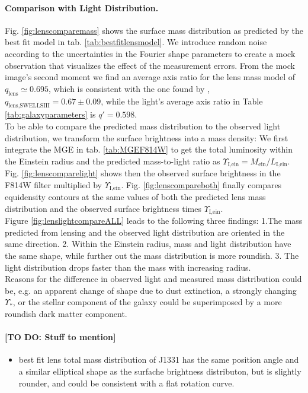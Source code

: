 
\paragraph{Comparison with Light Distribution.} Fig. \ref{fig:lenscomparemass} shows the surface mass distribution as predicted by the best fit model in tab. \ref{tab:bestfitlensmodel}. We introduce random noise according to the uncertainties in the Fourier shape parameters to create a mock observation that visualizes the effect of the measurement errors. From the mock image's second moment we find an average axis ratio for the lens mass model of $q_\text{lens} \simeq 0.695$, which is consistent with the one found by \citet{SWELLSIII}, $q_\text{lens,SWELLSIII} = 0.67 \pm 0.09$, while the light's average axis ratio in Table \ref{tab:galaxyparameters} is $q' = 0.598$.
\\To be able to compare the predicted mass distribution to the observed light distribution, we transform the surface brightness into a mass density: We first integrate the MGE in tab. \ref{tab:MGEF814W} to get the total luminosity within the Einstein radius and the predicted mass-to-light ratio as $\Upsilon_\text{I,ein} = M_\text{ein} / L_\text{I,ein}$. Fig. \ref{fig:lenscomparelight} shows then the observed surface brightness in the F814W filter multiplied by $\Upsilon_\text{I,ein}$.  Fig. \ref{fig:lenscompareboth} finally compares equidensity contours at the same values of both the predicted lens mass distribution and the observed surface brightness times $\Upsilon_\text{I,ein}$.
\\Figure \ref{fig:lenslightcompareALL} leads to the following three findings: 1.The mass predicted from lensing and the observed light distribution are oriented in the same direction. 2. Within the Einstein radius, mass and light distribution have the same shape, while further out the mass distribution is more roundish. 3. The light distribution drops faster than the mass with increasing radius. 
\\Reasons for the difference in observed light and measured mass distribution could be, e.g. an apparent change of shape due to dust extinction, a strongly changing $\Upsilon_*$, or the stellar component of the galaxy could be superimposed by a more roundish dark matter component.

\paragraph{[TO DO: Stuff to mention]}
\begin{itemize}
\item best fit lens total mass distribution of J1331 has the same position angle and a similar elliptical shape as the surfache brightness distributon, but is slightly rounder, and could be consistent with a flat rotation curve.
\end{itemize}

